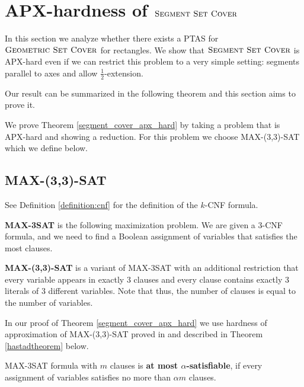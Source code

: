 \chapter{APX-hardness of $\textsc{Segment Set Cover}$}
\newcommand{\setCoverInstance}{(\points, \sets)}
\newcommand{\true}{\texttt{true}}
\newcommand{\false}{\texttt{false}}
\newcommand{\opt}{\mathsf{opt}}
\newcommand{\approximate}{\mathsf{approx}^{*}}

\label{chapter:segment_apx}

In this section we analyze whether there exists 
a PTAS for $\textsc{Geometric Set Cover}$ for rectangles.
We show that $\textsc{Segment Set Cover}$
is APX-hard even if we can restrict this problem
to a very simple setting:
segments parallel to axes and allow $\frac{1}{2}$-extension.

Our result can be summarized in the following
theorem and this section aims to prove it.

\segmentCoverApxHard*

We prove Theorem \ref{segment_cover_apx_hard}
by taking a problem that is APX-hard
and showing a reduction.
For this problem we choose
MAX-(3,3)-SAT which we define below.

\section{MAX-(3,3)-SAT}

See Definition \ref{definition:cnf}
for the definition of the $k$-CNF formula.

\begin{defi}
\textbf{MAX-3SAT} is the following maximization problem. We are given a 3-CNF
formula, and we need to find a Boolean assignment of variables
that satisfies the most clauses.
\end{defi}

\begin{defi}
\textbf{MAX-(3,3)-SAT} is a variant of MAX-3SAT with an additional
restriction that every variable appears in exactly 3 clauses
and every clause contains exactly 3 literals of 3 different variables.
Note that thus, the number of clauses is equal to the number of variables.
\end{defi}

In our proof of Theorem \ref{segment_cover_apx_hard} we use
hardness of approximation of MAX-(3,3)-SAT proved
in \cite{hastad} and described in
Theorem \ref{hastadtheorem} below.

\begin{defi}
MAX-3SAT formula with $m$ clauses is \textbf{at most $\alpha$-satisfiable}, if
every assignment of variables satisfies no more than $\alpha m$
clauses. 
\end{defi}

